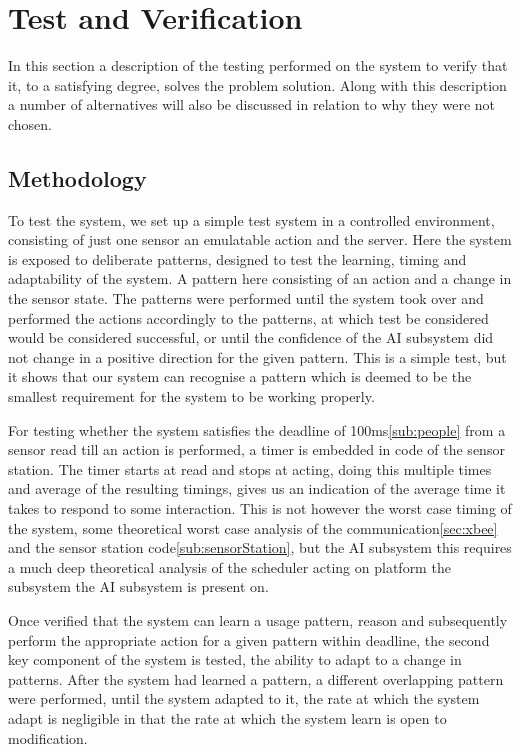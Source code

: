 \chapter{Test and Verification}
In this section a description of the testing performed on the system to verify that it, to a satisfying degree, solves the problem solution. Along with this description a number of alternatives will also be discussed in relation to why they were not chosen.

\section{Methodology}
To test the system, we set up a simple test system in a controlled environment, consisting of just one sensor an emulatable action and the server. Here the system is exposed to deliberate patterns, designed to test the learning, timing and adaptability of the system. A pattern here consisting of an action and a change in the sensor state. The patterns were performed until the system took over and performed the actions accordingly to the patterns, at which test be considered would be considered successful, or until the confidence of the AI subsystem did not change in a positive direction for the given pattern. This is a simple test, but it shows that our system can recognise a pattern which is deemed to be the smallest requirement for the system to be working properly.

For testing whether the system satisfies the deadline of 100ms\cref{sub:people} from a sensor read till an action is performed, a timer is embedded in code of the sensor station. The timer starts at read and stops at acting, doing this multiple times and average of the resulting timings, gives us an indication of the average time it takes to respond to some interaction. This is not however the worst case timing of the system, some theoretical worst case analysis of the communication\cref{sec:xbee} and the sensor station code\cref{sub:sensorStation}, but the AI subsystem this requires a much deep theoretical analysis of the scheduler acting on platform the subsystem the AI subsystem is present on.

Once verified that the system can learn a usage pattern, reason and subsequently perform the appropriate action for a given pattern within deadline, the second key component of the system is tested, the ability to adapt to a change in patterns. After the system had learned a pattern, a different overlapping pattern were performed, until the system adapted to it, the rate at which the system adapt is negligible in that the rate at which the system learn is open to modification.
